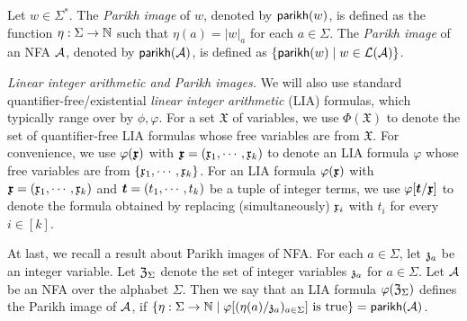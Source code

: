 Let $w \in \Sigma^*$. The \emph{Parikh image} of $w$, denoted by $\mathsf{parikh}(w)$, is defined as the function $\eta: \Sigma \rightarrow \mathbb{N}$ such that $\eta(a) = |w|_a$ for each $a \in \Sigma$. The \emph{Parikh image} of an NFA $\mathcal{A}$, denoted by $\mathsf{parikh}(\mathcal{A})$, is defined as $\{\mathsf{parikh}(w) \mid w \in \mathcal{L}(\mathcal{A})\}$.






\medskip
\noindent 
\emph{Linear integer arithmetic and Parikh images.}
We will also use standard quantifier-free/existential \emph{linear integer arithmetic} (LIA) formulas, which typically range over by $\phi, \varphi$. 
For a set $\mathfrak{X}$ of variables, we use $\Phi(\mathfrak{X})$ to denote the set of quantifier-free LIA formulas whose free variables are from $\mathfrak{X}$. 
For convenience, we use $\varphi(\vec{\anivar})$ with $\myvec{\anivar} = (\anivar_1, \cdots, \anivar_k)$ to denote an LIA formula $\varphi$ whose free variables are from $\{\mathfrak{x}_1, \cdots, \mathfrak{x}_k\}$. For an LIA formula $\varphi(\vec{\anivar})$ with $\myvec{\anivar} = (\anivar_1, \cdots, \anivar_k)$ and $\myvec{t} = (t_1, \cdots, t_k)$ be a tuple of integer terms, we use $\varphi[\myvec{t}/\myvec{\anivar}]$ to denote the formula obtained by replacing (simultaneously) $\mathfrak{x}_i$ with $t_i$ for every $i \in [k]$.

At last, we recall a result about Parikh images of NFA. 
For each $a \in \Sigma$, let $\mathfrak{z}_a$ be an integer variable. Let $\mathfrak{Z}_\Sigma$ denote the set of integer variables $\mathfrak{z}_a$ for $a \in \Sigma$. 
Let $\mathcal{A}$ be an NFA over the alphabet $\Sigma$. Then 
we say that an LIA formula $\varphi(\mathfrak{Z}_\Sigma)$ defines the Parikh image of $\mathcal{A}$, if $\{\eta: \Sigma \rightarrow \mathbb{N} \mid \varphi[(\eta(a) /\mathfrak{z}_a)_{a \in \Sigma}] \mbox{ is true}\} = \mathsf{parikh}(\mathcal{A})$. 

